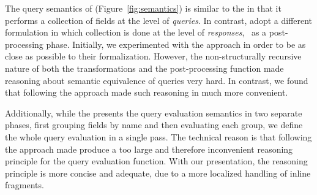 The query semantics of \gcoql (Figure~\ref{fig:semantics}) is similar to the \spec in that it performs a collection of fields at the level of {\em queries}. In contrast, \HP adopt a different formulation in which collection is done at the level of {\em responses}, \ie~as a post-processing phase. Initially, we experimented with the \HP approach in order to be as close as possible to their formalization. However, the non-structurally recursive nature of both the transformations and the post-processing function made reasoning about semantic equivalence of queries very hard. In contrast, we found that following the \spec approach made such reasoning in \coq much more convenient. 

Additionally, while the \spec presents the query evaluation semantics in two separate phases, first grouping fields by name and then evaluating each group, we define the whole query evaluation in a single pass. The technical reason is that following the \spec approach made \equations produce a too large and therefore inconvenient reasoning principle for the query evaluation function. With our presentation, the reasoning principle is more concise and adequate, due to a more localized handling of inline fragments.





